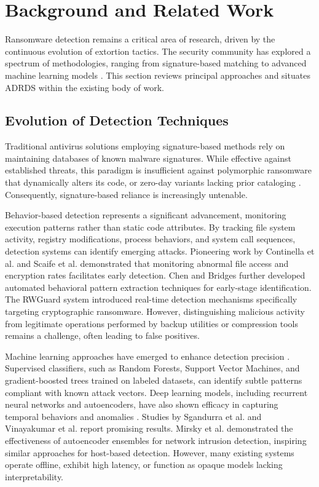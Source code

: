 \section{Background and Related Work}

Ransomware detection remains a critical area of research, driven by the continuous evolution of extortion tactics. The security community has explored a spectrum of methodologies, ranging from signature-based matching to advanced machine learning models \cite{al2018ransomware, ucci2019survey}. This section reviews principal approaches and situates ADRDS within the existing body of work.

\subsection{Evolution of Detection Techniques}

Traditional antivirus solutions employing signature-based methods rely on maintaining databases of known malware signatures. While effective against established threats, this paradigm is insufficient against polymorphic ransomware that dynamically alters its code, or zero-day variants lacking prior cataloging \cite{ye2017survey}. Consequently, signature-based reliance is increasingly untenable.

Behavior-based detection represents a significant advancement, monitoring execution patterns rather than static code attributes. By tracking file system activity, registry modifications, process behaviors, and system call sequences, detection systems can identify emerging attacks. Pioneering work by Continella et al. \cite{continella2016shieldfs} and Scaife et al. \cite{scaife2016cryptolock} demonstrated that monitoring abnormal file access and encryption rates facilitates early detection. Chen and Bridges \cite{chen2017ransomware} further developed automated behavioral pattern extraction techniques for early-stage identification. The RWGuard system \cite{mehnaz2018rwguard} introduced real-time detection mechanisms specifically targeting cryptographic ransomware. However, distinguishing malicious activity from legitimate operations performed by backup utilities or compression tools remains a challenge, often leading to false positives.

Machine learning approaches have emerged to enhance detection precision \cite{gibert2020rise}. Supervised classifiers, such as Random Forests, Support Vector Machines, and gradient-boosted trees trained on labeled datasets, can identify subtle patterns compliant with known attack vectors. Deep learning models, including recurrent neural networks and autoencoders, have also shown efficacy in capturing temporal behaviors and anomalies \cite{raff2018malware}. Studies by Sgandurra et al. \cite{sgandurra2016automated} and Vinayakumar et al. \cite{vinayakumar2019deep} report promising results. Mirsky et al. \cite{mirsky2018kitsune} demonstrated the effectiveness of autoencoder ensembles for network intrusion detection, inspiring similar approaches for host-based detection. However, many existing systems operate offline, exhibit high latency, or function as opaque models lacking interpretability.

